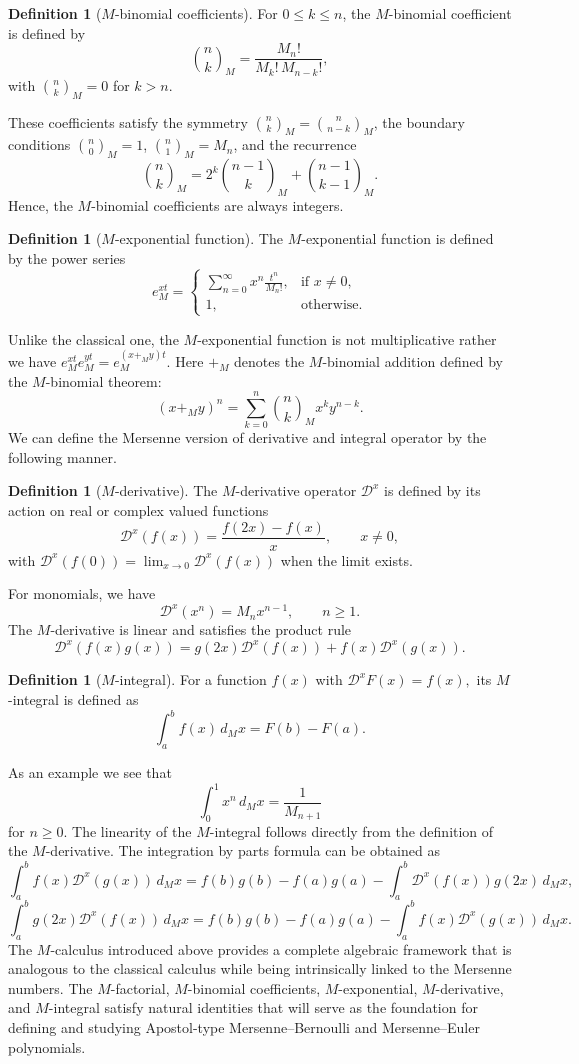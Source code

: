 \documentclass[12pt, a4paper]{article}
\theoremstyle{definition}
\newtheorem{definition}[theorem]{Definition}
\numberwithin{equation}{section}
\begin{document}
\begin{definition}[$M$-binomial coefficients]
For $0\le k\le n$, the $M$-binomial coefficient is defined by
\[
\binom{n}{k}_M = \frac{M_n!}{M_k!\,M_{n-k}!},
\]
with $\binom{n}{k}_M=0$ for $k>n$. 
\end{definition}
These coefficients satisfy the symmetry $\binom{n}{k}_M = \binom{n}{n-k}_M$, the boundary conditions $\binom{n}{0}_M=1$, $\binom{n}{1}_M=M_n$, and the recurrence
\[
\binom{n}{k}_M = 2^k\binom{n-1}{k}_M + \binom{n-1}{k-1}_M.
\]
Hence, the $M$-binomial coefficients are always integers.
\begin{definition}[$M$-exponential function]
The $M$-exponential function is defined by the power series
\[
e_M^{xt} = \begin{cases}
\displaystyle \sum_{n=0}^\infty x^n \frac{t^n}{M_n!}, & \text{if } x \neq 0,\\[1ex]
1, & \text{otherwise}.
\end{cases}
\]
\end{definition}
Unlike the classical one, the $M$-exponential function is not multiplicative rather we have $e_M^{xt}e_M^{yt}=e_M^{(x+_M y)t}.$ Here $+_M$ denotes the $M$-binomial addition defined by the $M$-binomial theorem:
\[
(x+_M y)^n = \sum_{k=0}^n \binom{n}{k}_M x^k y^{n-k}.
\]
We can define the Mersenne version of derivative and integral operator by the following manner.
\begin{definition}[$M$-derivative]
The $M$-derivative operator $\mathcal{D}^x$ is defined by its action on real or complex valued functions
\[
\mathcal{D}^x(f(x)) = \frac{f(2x)-f(x)}{x},\qquad x\neq 0,
\]
with $\mathcal{D}^x(f(0)) = \lim_{x\to 0}\mathcal{D}^x(f(x))$ when the limit exists.
\end{definition}
\noindent For monomials, we have
\[
\mathcal{D}^x(x^n) = M_n x^{n-1},\qquad n\ge 1.
\]
The $M$-derivative is linear and satisfies the product rule
\[
\mathcal{D}^x(f(x)g(x)) = g(2x)\mathcal{D}^x(f(x)) + f(x)\mathcal{D}^x(g(x)).
\]

\begin{definition}[$M$-integral]
For a function $f(x)$ with $\mathcal{D}^xF(x) = f(x),$ its $M$-integral is defined as
\[
\int_a^b f(x)\,d_M x = F(b)-F(a).
\]
\end{definition}
\noindent As an example we see that
\[
\int_0^1 x^{n}\,d_M x = \frac{1}{M_{n+1}}
\]
for $n\geq 0.$
\noindent The linearity of the $M$-integral follows directly from the definition of the $M$-derivative. The integration by parts formula can be obtained as
\[
\int_{a}^{b} f(x)\mathcal{D}^{x} (g(x))\,d_M x = f(b)g(b)-f(a)g(a)-\int_{a}^{b} \mathcal{D}^{x} (f(x)) g(2x)\,d_M x,
\]
\[
\int_{a}^{b} g(2x)\mathcal{D}^{x} (f(x)) \,d_M x = f(b)g(b)-f(a)g(a)-\int_{a}^{b} f(x)\mathcal{D}^{x} (g(x))\,d_M x.
\]
The $M$-calculus introduced above provides a complete algebraic framework that is analogous to the classical calculus while being intrinsically linked to the Mersenne numbers. The $M$-factorial, $M$-binomial coefficients, $M$-exponential, $M$-derivative, and $M$-integral satisfy natural identities that will serve as the foundation for defining and studying Apostol-type Mersenne–Bernoulli and Mersenne–Euler polynomials.
\end{document}
